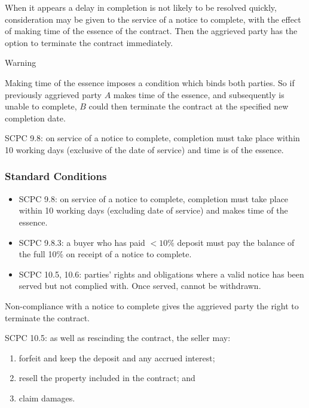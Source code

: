 \documentclass[
]{article}
\providecommand{\tightlist}{%
  \setlength{\itemsep}{0pt}\setlength{\parskip}{0pt}}
\newenvironment{env-c461d38a-fca7-4cca-937e-d7deb1d6d407}
{
    \savenotes\tcolorbox[blanker,breakable,left=5pt,borderline west={2pt}{-4pt}{orange}]
}
{
    \endtcolorbox\spewnotes
}
\begin{document}
When it appears a delay in completion is not likely to be resolved
quickly, consideration may be given to the service of a notice to
complete, with the effect of making time of the essence of the contract.
Then the aggrieved party has the option to terminate the contract
immediately.

\begin{env-c461d38a-fca7-4cca-937e-d7deb1d6d407}

Warning

Making time of the essence imposes a condition which binds both parties.
So if previously aggrieved party {\(A\)} makes time of the essence, and
subsequently is unable to complete, {\(B\)} could then terminate the
contract at the specified new completion date.

\end{env-c461d38a-fca7-4cca-937e-d7deb1d6d407}

SCPC 9.8: on service of a notice to complete, completion must take place
within 10 working days (exclusive of the date of service) and time is of
the essence.

\hypertarget{standard-conditions-2}{%
\subsubsection{Standard Conditions}\label{standard-conditions-2}}

\begin{itemize}
\tightlist
\item
  SCPC 9.8: on service of a notice to complete, completion must take
  place within 10 working days (excluding date of service) and makes
  time of the essence.
\item
  SCPC 9.8.3: a buyer who has paid {\(< 10\%\)} deposit must pay the
  balance of the full 10\% on receipt of a notice to complete.
\item
  SCPC 10.5, 10.6: parties' rights and obligations where a valid notice
  has been served but not complied with. Once served, cannot be
  withdrawn.
\end{itemize}

Non-compliance with a notice to complete gives the aggrieved party the
right to terminate the contract.

SCPC 10.5: as well as rescinding the contract, the seller may:

\begin{enumerate}
\tightlist
\item
  forfeit and keep the deposit and any accrued interest;
\item
  resell the property included in the contract; and
\item
  claim damages.
\end{enumerate}
\end{document}
